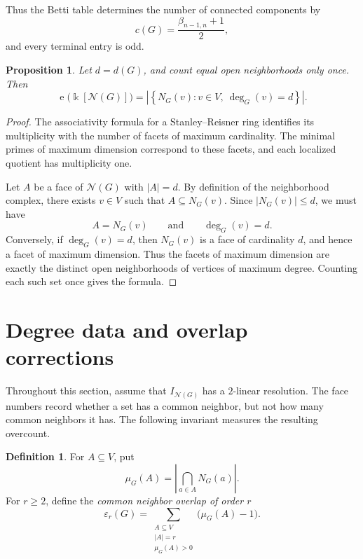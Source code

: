 \documentclass[11pt]{amsart}
\newtheorem{proposition}[theorem]{Proposition}
\theoremstyle{definition}
\newtheorem{definition}[theorem]{Definition}
\theoremstyle{remark}
\numberwithin{equation}{section}
\newcommand{\NN}{\mathcal N}
\newcommand{\mult}{\operatorname{e}}
\begin{document}
	Thus the Betti table determines the number of connected components by
	\[
	c(G)=\frac{\beta_{n-1,n}+1}{2},
	\]
	and every terminal entry is odd.
	
	\begin{proposition}\label{prop:multiplicity}
		Let \(d=d(G)\), and count equal open neighborhoods only once.
		Then
		\[
		\mult\bigl(\Bbbk[\NN(G)]\bigr)
		=
		\left|
		\left\{
		N_G(v):v\in V,\ \deg_G(v)=d
		\right\}
		\right|.
		\]
	\end{proposition}
	
	\begin{proof}
		The associativity formula for a Stanley--Reisner ring identifies its
		multiplicity with the number of facets of maximum cardinality. The minimal
		primes of maximum dimension correspond to these facets, and each localized
		quotient has multiplicity one.
		
		Let \(A\) be a face of \(\NN(G)\) with \(|A|=d\). By definition of the
		neighborhood complex, there exists \(v\in V\) such that
		\(A\subseteq N_G(v)\). Since \(|N_G(v)|\le d\), we must have
		\[
		A=N_G(v)
		\qquad\text{and}\qquad
		\deg_G(v)=d.
		\]
		Conversely, if \(\deg_G(v)=d\), then \(N_G(v)\) is a face of cardinality
		\(d\), and hence a facet of maximum dimension. Thus the facets of maximum dimension are exactly the distinct open
		neighborhoods of vertices of maximum degree. Counting each such set once gives
		the formula.
	\end{proof}
	
	\section{Degree data and overlap corrections}\label{sec:overlap}
	
	Throughout this section, assume that \(I_{\NN(G)}\) has a \(2\)-linear
	resolution. The face numbers record whether a set has a common neighbor, but not
	how many common neighbors it has. The following invariant measures the resulting
	overcount.
	
	\begin{definition}
		For \(A\subseteq V\), put
		\[
		\mu_G(A)=\left|\bigcap_{a\in A}N_G(a)\right|.
		\]
		For \(r\ge2\), define the \emph{common neighbor overlap of order \(r\)}
		\[
		\varepsilon_r(G)=
		\sum_{\substack{A\subseteq V\\|A|=r\\\mu_G(A)>0}}
		\bigl(\mu_G(A)-1\bigr).
		\]
	\end{definition}
	
\end{document}
